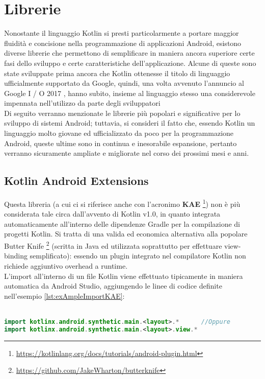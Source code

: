 \section{Librerie}
Nonostante il linguaggio Kotlin si presti particolarmente a portare maggior fluidità e concisione nella programmazione di applicazioni Android, esistono diverse librerie che permettono di semplificare in maniera ancora superiore certe fasi dello sviluppo e certe caratteristiche dell'applicazione. Alcune di queste sono state sviluppate prima ancora che Kotlin ottenesse il titolo di linguaggio ufficialmente supportato da Google, quindi, una volta avvenuto l'annuncio al Google I / O 2017 \cite{googleio}, hanno subito, insieme al linguaggio stesso una considerevole impennata nell'utilizzo da parte degli sviluppatori\\
Di seguito verranno menzionate le librerie più popolari e significative per lo sviluppo di sistemi Android; tuttavia, si consideri il fatto che, essendo Kotlin un linguaggio molto giovane ed ufficializzato da poco per la programmazione Android, queste ultime sono in continua e inesorabile espansione, pertanto verranno sicuramente ampliate e migliorate nel corso dei prossimi mesi e anni.\\

\subsection{Kotlin Android Extensions}
Questa libreria (a cui ci si riferisce anche con l’acronimo {\bfseries KAE} \footnote{\url{https://kotlinlang.org/docs/tutorials/android-plugin.html}}) non è più considerata tale circa dall'avvento di Kotlin v1.0, in quanto integrata automaticamente all'interno delle dipendenze Gradle per la compilazione di progetti Kotlin. Si tratta di una valida ed economica alternativa alla popolare Butter Knife \footnote{\url{https://github.com/JakeWharton/butterknife}} (scritta in Java ed utilizzata soprattutto per effettuare view-binding semplificato): essendo un plugin integrato nel compilatore Kotlin non richiede aggiuntivo overhead a runtime.\\
L'import all'interno di un file Kotlin viene effettuato tipicamente in maniera automatica da Android Studio, aggiungendo le linee di codice definite nell'esempio \ref{lst:exAmpleImportKAE}:\\
\\

\begin{lstlisting}[caption={Import delle Kotlin Android Extensions}, captionpos=b, label={lst:exAmpleImportKAE}, language=Kotlin]
import kotlinx.android.synthetic.main.<layout>.*      //Oppure
import kotlinx.android.synthetic.main.<layout>.view.*
\end{lstlisting}

